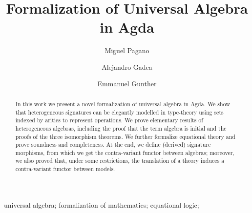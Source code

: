 \documentclass{msc}
\begin{document}


\title{Formalization of Universal Algebra in Agda}

\begin{authgrp}
  \author{Miguel Pagano}
  \author{Alejandro Gadea}
\author{ Emmanuel Gunther}


\end{authgrp}



\begin{abstract}
In this work we present a novel formalization of
universal algebra in Agda. We show that heterogeneous signatures can
be elegantly modelled in type-theory using sets indexed by arities to
represent operations. We prove elementary results of heterogeneous
algebras, including the proof that the term algebra is initial and the
proofs of the three isomorphism theorems. We further formalize equational theory and
prove soundness and completeness. At the end, we define (derived)
signature morphisms, from which we get the contra-variant functor
between algebras; moreover, we also proved that, under some
restrictions, the translation of a theory induces a contra-variant
functor between models.
\end{abstract}

\begin{keywords}
  universal algebra; formalization of mathematics; equational logic;
\end{keywords}

\maketitle



\end{document}
